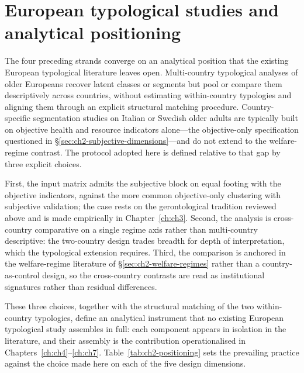 \section{European typological studies and analytical positioning}
\label{sec:ch2-typologies}

The four preceding strands converge on an analytical position that the existing European typological literature leaves open. Multi-country typological analyses of older Europeans \citep{lestari2022} recover latent classes or segments but pool or compare them descriptively across countries, without estimating within-country typologies and aligning them through an explicit structural matching procedure. Country-specific segmentation studies on Italian or Swedish older adults are typically built on objective health and resource indicators alone---the objective-only specification questioned in \S\ref{sec:ch2-subjective-dimensions}---and do not extend to the welfare-regime contrast. The protocol adopted here is defined relative to that gap by three explicit choices.

First, the input matrix admits the subjective block on equal footing with the objective indicators, against the more common objective-only clustering with subjective validation; the case rests on the gerontological tradition reviewed above and is made empirically in Chapter~\ref{ch:ch3}. Second, the analysis is cross-country comparative on a single regime axis rather than multi-country descriptive: the two-country design trades breadth for depth of interpretation, which the typological extension requires. Third, the comparison is anchored in the welfare-regime literature of \S\ref{sec:ch2-welfare-regimes} rather than a country-as-control design, so the cross-country contrasts are read as institutional signatures rather than residual differences.

These three choices, together with the structural matching of the two within-country typologies, define an analytical instrument that no existing European typological study assembles in full: each component appears in isolation in the literature, and their assembly is the contribution operationalised in Chapters~\ref{ch:ch4}--\ref{ch:ch7}. Table~\ref{tab:ch2-positioning} sets the prevailing practice against the choice made here on each of the five design dimensions.

